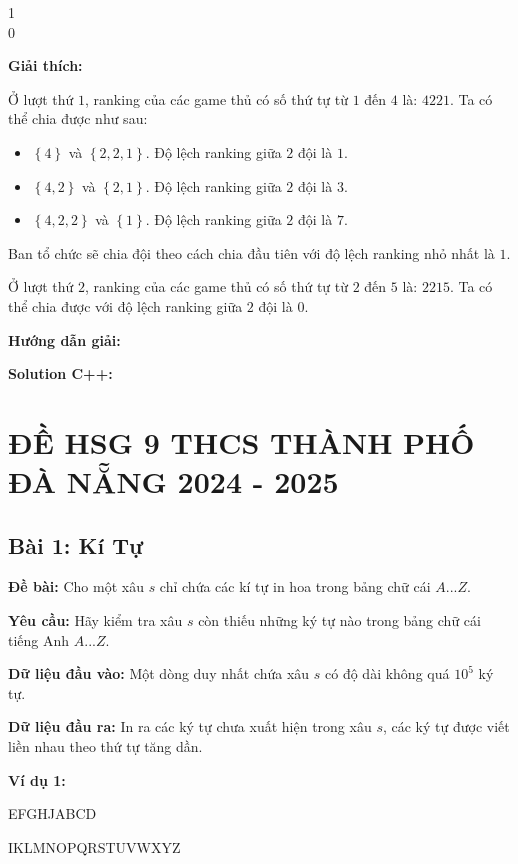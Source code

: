 \documentclass[12pt]{scrartcl}  %
\begin{document}
\begin{tcolorbox}[colback=gray!5!white, colframe=green!50!black, title=Output]
1\\
0
\end{tcolorbox}

\textbf{Giải thích:}

Ở lượt thứ $1$, ranking của các game thủ có số thứ tự từ $1$ đến $4$ là: $4 2 2 1$. Ta có thể chia được như sau:

\begin{itemize}
    \item $\left\{ 4 \right\}$ và $\left\{ 2, 2, 1 \right\}$. Độ lệch ranking giữa $2$ đội là $1$. 
    \item $\left\{ 4, 2 \right\}$ và $\left\{ 2, 1 \right\}$. Độ lệch ranking giữa $2$ đội là $3$. 
    \item $\left\{ 4, 2, 2 \right\}$ và $\left\{ 1 \right\}$. Độ lệch ranking giữa $2$ đội là $7$.
\end{itemize}

Ban tổ chức sẽ chia đội theo cách chia đầu tiên với độ lệch ranking nhỏ nhất là $1$.

Ở lượt thứ $2$, ranking của các game thủ có số thứ tự từ $2$ đến $5$ là: $2 2 1 5$. Ta có thể chia được với độ lệch ranking giữa $2$ đội là $0$.

\textbf{Hướng dẫn giải:}

\textbf{Solution C++:}

\section{ĐỀ HSG 9 THCS THÀNH PHỐ ĐÀ NẴNG 2024 - 2025}

\subsection{Bài 1: Kí Tự}
\textbf{Đề bài:}
Cho một xâu $s$ chỉ chứa các kí tự in hoa trong bảng chữ cái $A...Z$.

\textbf{Yêu cầu:}
Hãy kiểm tra xâu $s$ còn thiếu những ký tự nào trong bảng chữ cái tiếng Anh $A...Z$.

\textbf{Dữ liệu đầu vào:}
Một dòng duy nhất chứa xâu $s$ có độ dài không quá $10^5$ ký tự.

\textbf{Dữ liệu đầu ra:}
In ra các ký tự chưa xuất hiện trong xâu $s$, các ký tự được viết liền nhau theo thứ tự tăng dần.

\textbf{Ví dụ 1:}
\begin{tcolorbox}[colback=gray!5!white, colframe=blue!50!black, title=Input]
EFGHJABCD
\end{tcolorbox}
\begin{tcolorbox}[colback=gray!5!white, colframe=green!50!black, title=Output]
IKLMNOPQRSTUVWXYZ
\end{tcolorbox}
\end{document}
